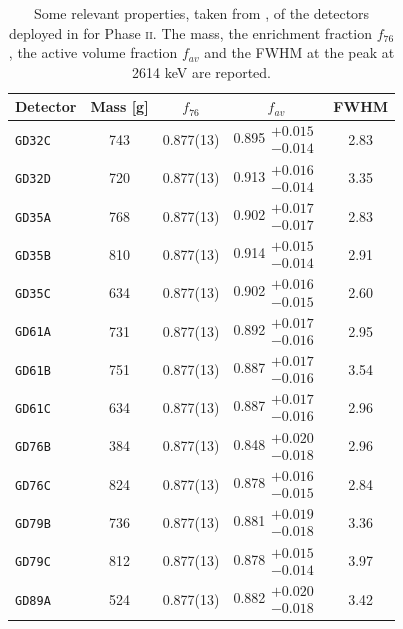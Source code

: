 \begin{table}
	\centering
		\caption{Some relevant properties, taken from \cite{GSTR-13-009,GSTR-16-002}, of the detectors deployed in {\gerda} for Phase \textsc{ii}. The mass, the enrichment fraction $f_{76}$, the active volume fraction $f_{av}$ and the FWHM at the  peak at 2614 keV are reported.}\label{tab:gedet2}
	{\renewcommand{\arraystretch}{1.3}
	\begin{tabular}{lcccc}
		\toprule
		Detector		&	Mass [g]	&	$f_{76}$	&	$f_{av}$	&	FWHM \\
		\midrule
		\texttt{GD32C}	&	743 	&	0.877(13)	&	0.895$\substack{+0.015\\-0.014}$	&	2.83	\\
		\texttt{GD32D}	&	720 	&	0.877(13)	&	0.913$\substack{+0.016\\-0.014}$	&	3.35	\\
		\texttt{GD35A}	&	768 	&	0.877(13)	&	0.902$\substack{+0.017\\-0.017}$	&	2.83	\\
		\texttt{GD35B}	&	810 	&	0.877(13)	&	0.914$\substack{+0.015\\-0.014}$	&	2.91	\\
		\texttt{GD35C}	&	634 	&	0.877(13)	&	0.902$\substack{+0.016\\-0.015}$	&	2.60	\\
		\texttt{GD61A}	&	731 	&	0.877(13)	&	0.892$\substack{+0.017\\-0.016}$	&	2.95	\\
		\texttt{GD61B}	&	751 	&	0.877(13)	&	0.887$\substack{+0.017\\-0.016}$	&	3.54	\\
		\texttt{GD61C}	&	634 	&	0.877(13)	&	0.887$\substack{+0.017\\-0.016}$	&	2.96	\\
		\texttt{GD76B}	&	384 	&	0.877(13)	&	0.848$\substack{+0.020\\-0.018}$	&	2.96	\\
		\texttt{GD76C}	&	824 	&	0.877(13)	&	0.878$\substack{+0.016\\-0.015}$	&	2.84	\\
		\texttt{GD79B}	&	736 	&	0.877(13)	&	0.881$\substack{+0.019\\-0.018}$	&	3.36	\\
		\texttt{GD79C}	&	812 	&	0.877(13)	&	0.878$\substack{+0.015\\-0.014}$	&	3.97	\\
		\texttt{GD89A}	&	524 	&	0.877(13)	&	0.882$\substack{+0.020\\-0.018}$	&	3.42	\\

\end{tabular}}
\end{table}
